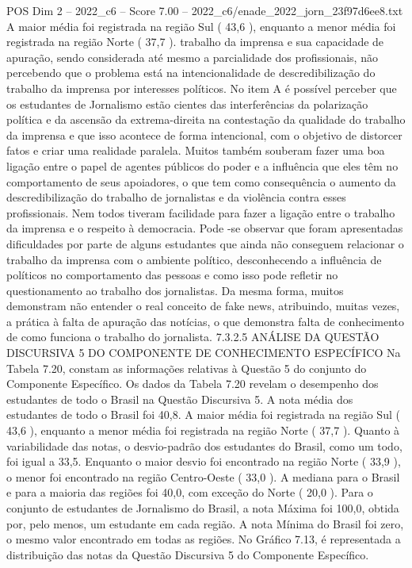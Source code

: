 \begin{textsample}{POS Dim 2 – 2022\_c6 – Score 7.00 – 2022\_c6/enade\_2022\_jorn\_23f97d6ee8.txt}
A maior média foi registrada na região Sul ( 43,6 ), enquanto a menor média foi registrada na região Norte ( 37,7 ). trabalho da imprensa e sua capacidade de apuração, sendo considerada até mesmo a parcialidade dos profissionais, não percebendo que o problema está na intencionalidade de descredibilização do trabalho da imprensa por interesses políticos.
No item A é possível perceber que os estudantes de Jornalismo estão cientes das interferências da polarização política e da ascensão da extrema-direita na contestação da qualidade do trabalho da imprensa e que isso acontece de forma intencional, com o objetivo de distorcer fatos e criar uma realidade paralela.
Muitos também souberam fazer uma boa ligação entre o papel de agentes públicos do poder e a influência que eles têm no comportamento de seus apoiadores, o que tem como consequência o aumento da descredibilização do trabalho de jornalistas e da violência contra esses profissionais.
Nem todos tiveram facilidade para fazer a ligação entre o trabalho da imprensa e o respeito à democracia.
Pode -se observar que foram apresentadas dificuldades por parte de alguns estudantes que ainda não conseguem relacionar o trabalho da imprensa com o ambiente político, desconhecendo a influência de políticos no comportamento das pessoas e como isso pode refletir no questionamento ao trabalho dos jornalistas.
Da mesma forma, muitos demonstram não entender o real conceito de fake news, atribuindo, muitas vezes, a prática à falta de apuração das notícias, o que demonstra falta de conhecimento de como funciona o trabalho do jornalista. 7.3.2.5 ANÁLISE DA QUESTÃO DISCURSIVA 5 DO COMPONENTE DE CONHECIMENTO ESPECÍFICO Na Tabela 7.20, constam as informações relativas à Questão 5 do conjunto do Componente Específico.
Os dados da Tabela 7.20 revelam o desempenho dos estudantes de todo o Brasil na Questão Discursiva 5.
A nota média dos estudantes de todo o Brasil foi 40,8.
A maior média foi registrada na região Sul ( 43,6 ), enquanto a menor média foi registrada na região Norte ( 37,7 ).
Quanto à variabilidade das notas, o desvio-padrão dos estudantes do Brasil, como um todo, foi igual a 33,5.
Enquanto o maior desvio foi encontrado na região Norte ( 33,9 ), o menor foi encontrado na região Centro-Oeste ( 33,0 ).
A mediana para o Brasil e para a maioria das regiões foi 40,0, com exceção do Norte ( 20,0 ).
Para o conjunto de estudantes de Jornalismo do Brasil, a nota Máxima foi 100,0, obtida por, pelo menos, um estudante em cada região.
A nota Mínima do Brasil foi zero, o mesmo valor encontrado em todas as regiões.
No Gráfico 7.13, é representada a distribuição das notas da Questão Discursiva 5 do Componente Específico.

\end{textsample}
